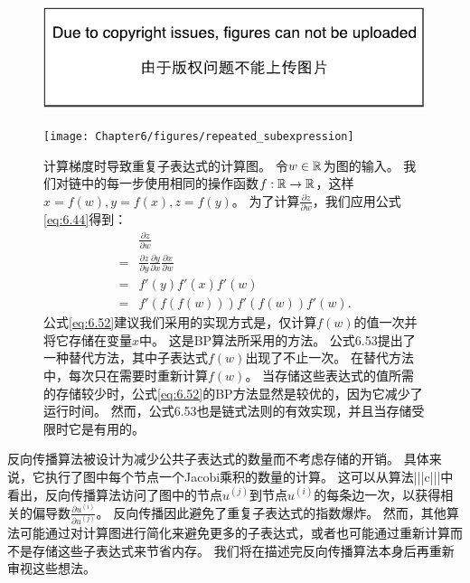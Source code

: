 \begin{figure}[!htb]
\ifOpenSource
\centerline{\includegraphics{figure.pdf}}
\else
\centerline{\texttt{[image: Chapter6/figures/repeated\_subexpression]}}
\fi
\captionsetup{singlelinecheck=off}
\caption[.]{
计算梯度时导致重复子表达式的计算图。
令$w \in \mathbb{R}$为图的输入。
我们对链中的每一步使用相同的操作函数$f: \mathbb{R} \to \mathbb{R}$，这样$x=f(w), y=f(x), z=f(y)$。
为了计算$\frac{\partial z}{\partial w}$，我们应用公式\ref{eq:6.44}得到：
\begin{align}
& \frac{\partial z}{\partial w}\\
=& \frac{\partial z}{\partial y} \frac{\partial y}{\partial x} \frac{\partial x}{\partial w}\\
\label{eq:6.52}
=& f'(y)f'(x)f'(w)\\ 
=& f'(f(f(w))) f'(f(w)) f'(w). 
\end{align}
公式\ref{eq:6.52}建议我们采用的实现方式是，仅计算$f(w)$的值一次并将它存储在变量$x$中。
这是\gls{BP}算法所采用的方法。
公式6.53提出了一种替代方法，其中子表达式$f(w)$出现了不止一次。 %
在替代方法中，每次只在需要时重新计算$f(w)$。
当存储这些表达式的值所需的存储较少时，公式\ref{eq:6.52}的\gls{BP}方法显然是较优的，因为它减少了运行时间。
然而，公式6.53也是链式法则的有效实现，并且当存储受限时它是有用的。}
\label{fig:chap6_repeated_subexpression}
\end{figure}


反向传播算法被设计为减少公共子表达式的数量而不考虑存储的开销。
具体来说，它执行了图中每个节点一个Jacobi乘积的数量的计算。
这可以从算法|||c|||中看出，反向传播算法访问了图中的节点$u^{(j)}$到节点$u^{(i)}$的每条边一次，以获得相关的偏导数$\frac{\partial u^{(i)}}{\partial u^{(j)}}$。
反向传播因此避免了重复子表达式的指数爆炸。
然而，其他算法可能通过对计算图进行简化来避免更多的子表达式，或者也可能通过重新计算而不是存储这些子表达式来节省内存。
我们将在描述完反向传播算法本身后再重新审视这些想法。

